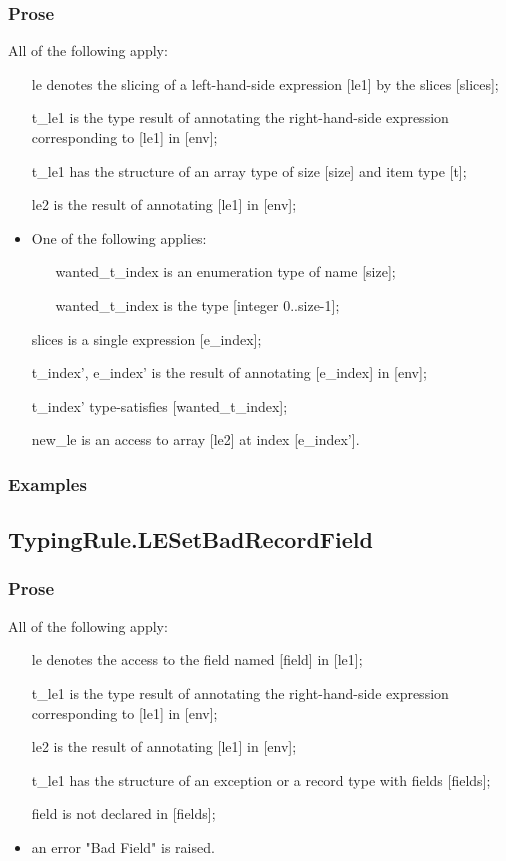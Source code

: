\documentclass{book}
\begin{document}
    \subsubsection{Prose}
    All of the following apply:
   \begin{itemize}
   \item [le] denotes the slicing of a left-hand-side expression [le1] by the slices [slices];
   \item [t\_le1] is the type result of annotating the right-hand-side expression corresponding to [le1] in [env];
   \item [t\_le1] has the structure of an array type of size [size] and item type [t];
   \item [le2] is the result of annotating [le1] in [env];
   \item One of the following applies:
     \begin{itemize}
     \item [wanted\_t\_index] is an enumeration type of name [size];
     \item [wanted\_t\_index] is the type [integer {0..size-1}];
     \end{itemize}
   \item [slices] is a single expression [e\_index];
   \item [t\_index', e\_index'] is the result of annotating [e\_index] in [env];
   \item [t\_index'] type-satisfies [wanted\_t\_index];
   \item [new\_le] is an access to array [le2] at index [e\_index'].  
   \end{itemize}

    \subsubsection{Examples}

\subsection{TypingRule.LESetBadRecordField}

    \subsubsection{Prose}
    All of the following apply:
   \begin{itemize}
   \item [le] denotes the access to the field named [field] in [le1];
   \item [t\_le1] is the type result of annotating the right-hand-side expression corresponding to [le1] in [env];
   \item [le2] is the result of annotating [le1] in [env];
   \item [t\_le1] has the structure of an exception or a record type with fields [fields];
   \item [field] is not declared in [fields];
   \item an error "Bad Field" is raised.
   \end{itemize}
\end{document}
